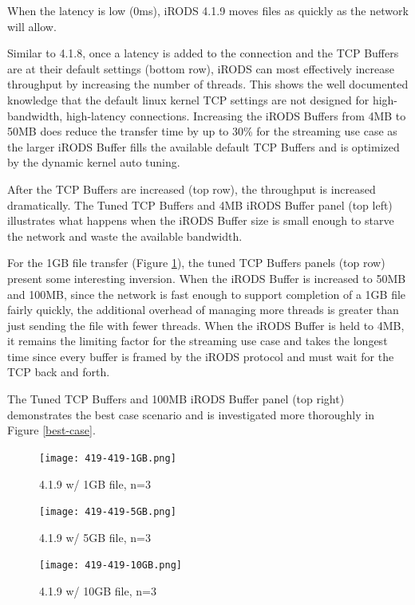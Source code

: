 \documentclass[letter, 11pt]{article}
\begin{document}
When the latency is low (0ms), iRODS 4.1.9 moves files as quickly as the network will allow.

Similar to 4.1.8, once a latency is added to the connection and the TCP Buffers are at their
default settings (bottom row), iRODS can most effectively increase throughput by increasing the number of threads.
This shows the well documented knowledge that the default linux kernel TCP settings are not designed
for high-bandwidth, high-latency connections.  Increasing the iRODS Buffers from 4MB to 50MB does reduce
the transfer time by up to 30\% for the streaming use case as the larger iRODS Buffer fills the available default TCP
Buffers and is optimized by the dynamic kernel auto tuning.

After the TCP Buffers are increased (top row), the throughput is increased dramatically.  The
Tuned TCP Buffers and 4MB iRODS Buffer panel (top left) illustrates what happens when the
iRODS Buffer size is small enough to starve the network and waste the available bandwidth.

For the 1GB file transfer (Figure \ref{419-1gb}), the tuned TCP Buffers panels (top row) present some interesting
inversion.  When the iRODS Buffer is increased to 50MB and 100MB, since the network is fast enough to 
support completion of a 1GB file fairly quickly, the additional overhead of managing more threads is
greater than just sending the file with fewer threads.  When the iRODS Buffer is held to 4MB, it remains the
limiting factor for the streaming use case and takes the longest time since every buffer is framed by the
iRODS protocol and must wait for the TCP back and forth.

The Tuned TCP Buffers and 100MB iRODS Buffer panel (top right) demonstrates the best case
scenario and is investigated more thoroughly in Figure \ref{best-case}.


\clearpage
\begin{figure}[h]
    \centering
    \texttt{[image: 419-419-1GB.png]}
    \caption{4.1.9 w/ 1GB file, n=3}
    \label{419-1gb}
\end{figure}

\clearpage
\begin{figure}[h]
    \centering
    \texttt{[image: 419-419-5GB.png]}
    \caption{4.1.9 w/ 5GB file, n=3}
\end{figure}

\clearpage
\begin{figure}[h]
    \centering
    \texttt{[image: 419-419-10GB.png]}
    \caption{4.1.9 w/ 10GB file, n=3}
    \label{419-10gb}
\end{figure}
\end{document}
